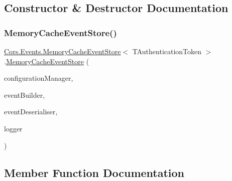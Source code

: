 \subsection{Constructor \& Destructor Documentation}
\mbox{\label{classCqrs_1_1Events_1_1MemoryCacheEventStore_a4de9139e05d35cb62ba295569a1dc94f_a4de9139e05d35cb62ba295569a1dc94f}} 
\subsubsection{\texorpdfstring{Memory\+Cache\+Event\+Store()}{MemoryCacheEventStore()}}
{\footnotesize\ttfamily \hyperlink{classCqrs_1_1Events_1_1MemoryCacheEventStore}{Cqrs.\+Events.\+Memory\+Cache\+Event\+Store}$<$ T\+Authentication\+Token $>$.\hyperlink{classCqrs_1_1Events_1_1MemoryCacheEventStore}{Memory\+Cache\+Event\+Store} (\begin{DoxyParamCaption}\item[{\hyperlink{interfaceCqrs_1_1Configuration_1_1IConfigurationManager}{I\+Configuration\+Manager}}]{configuration\+Manager,  }\item[{\hyperlink{interfaceCqrs_1_1Events_1_1IEventBuilder}{I\+Event\+Builder}$<$ T\+Authentication\+Token $>$}]{event\+Builder,  }\item[{\hyperlink{interfaceCqrs_1_1Events_1_1IEventDeserialiser}{I\+Event\+Deserialiser}$<$ T\+Authentication\+Token $>$}]{event\+Deserialiser,  }\item[{I\+Logger}]{logger }\end{DoxyParamCaption})}



\subsection{Member Function Documentation}
\mbox{\label{classCqrs_1_1Events_1_1MemoryCacheEventStore_a1391c260f52f5cf18058cf88ad2d16de_a1391c260f52f5cf18058cf88ad2d16de}} 
